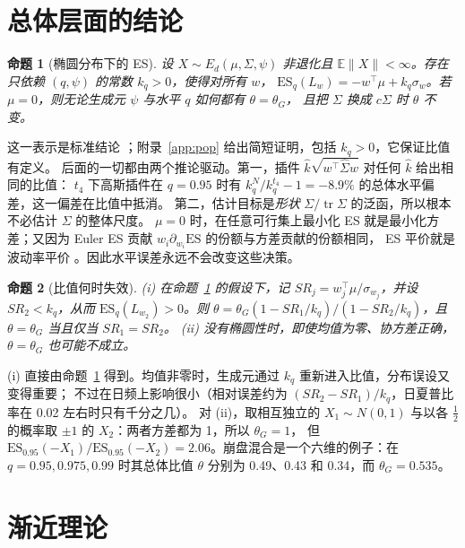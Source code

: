 \documentclass[11pt,UTF8]{ctexart}
\newcommand{\E}{\mathbb{E}}
\newcommand{\ES}{\mathrm{ES}}
\newcommand{\tr}{\operatorname{tr}}
\newtheorem{proposition}{命题}
\begin{document}
\section{总体层面的结论}\label{sec:pop}

\begin{proposition}[椭圆分布下的 ES]\label{prop:es}
设 $X\sim E_d(\mu,\Sigma,\psi)$ 非退化且 $\E\|X\|<\infty$。存在只依赖 $(q,\psi)$ 的常数 $k_q>0$，使得对所有 $w$，
$\ES_q(L_w)=-w^\top\mu+k_q\sigma_w$。若 $\mu=0$，则无论生成元 $\psi$ 与水平 $q$ 如何都有 $\theta=\theta_G$，
且把 $\Sigma$ 换成 $c\Sigma$ 时 $\theta$ 不变。
\end{proposition}

这一表示是标准结论 \citep[第~6~章]{mcneil2015}；附录~\ref{app:pop} 给出简短证明，包括 $k_q>0$，它保证比值有定义。
后面的一切都由两个推论驱动。第一，插件 $\hat k\sqrt{w^\top\hat\Sigma w}$ 对任何 $\hat k$ 给出相同的比值：
$t_4$ 下高斯插件在 $q=0.95$ 时有 $k^N_q/k^{t_4}_q-1=-8.9\%$ 的总体水平偏差，这一偏差在比值中抵消。
第二，估计目标是\emph{形状} $\Sigma/\tr\Sigma$ 的泛函，所以根本不必估计 $\Sigma$ 的整体尺度。
$\mu=0$ 时，在任意可行集上最小化 ES 就是最小化方差；又因为 Euler ES 贡献 $w_i\partial_{w_i}\ES$ 的份额与方差贡献的份额相同，
ES 平价就是波动率平价 \citep{tasche1999}。因此水平误差永远不会改变这些决策。

\begin{proposition}[比值何时失效]\label{prop:bound}
(i) 在命题~\ref{prop:es} 的假设下，记 $SR_j=w_j^\top\mu/\sigma_{w_j}$，并设 $SR_2<k_q$，从而 $\ES_q(L_{w_2})>0$。则
$\theta=\theta_G(1-SR_1/k_q)/(1-SR_2/k_q)$，且 $\theta=\theta_G$ 当且仅当 $SR_1=SR_2$。
(ii) 没有椭圆性时，即使均值为零、协方差正确，$\theta=\theta_G$ 也可能不成立。
\end{proposition}

(i) 直接由命题~\ref{prop:es} 得到。均值非零时，生成元通过 $k_q$ 重新进入比值，分布误设又变得重要；
不过在日频上影响很小（相对误差约为 $(SR_2-SR_1)/k_q$，日夏普比率在 0.02 左右时只有千分之几）。
对 (ii)，取相互独立的 $X_1\sim N(0,1)$ 与以各 $\frac12$ 的概率取 $\pm1$ 的 $X_2$：两者方差都为 1，所以 $\theta_G=1$，
但 $\ES_{0.95}(-X_1)/\ES_{0.95}(-X_2)=2.06$。崩盘混合是一个六维的例子：在 $q=0.95,0.975,0.99$ 时其总体比值 $\theta$
分别为 0.49、0.43 和 0.34，而 $\theta_G=0.535$。

\section{渐近理论}\label{sec:asy}
\end{document}
